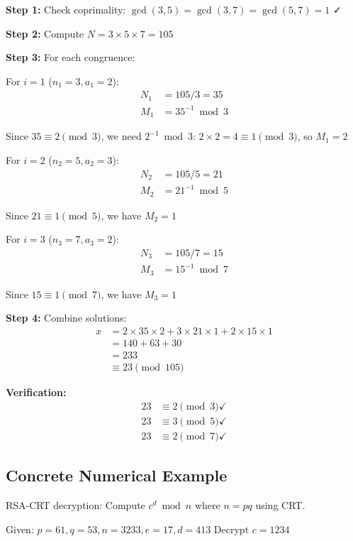 \documentclass[12pt,a4paper]{article}
\theoremstyle{definition}
\begin{document}
\textbf{Step 1:} Check coprimality: $\gcd(3,5) = \gcd(3,7) = \gcd(5,7) = 1$ ✓

\textbf{Step 2:} Compute $N = 3 \times 5 \times 7 = 105$

\textbf{Step 3:} For each congruence:

For $i = 1$ ($n_1 = 3, a_1 = 2$):
\begin{align}
N_1 &= 105/3 = 35\\
M_1 &= 35^{-1} \bmod 3
\end{align}

Since $35 \equiv 2 \pmod{3}$, we need $2^{-1} \bmod 3$:
$2 \times 2 = 4 \equiv 1 \pmod{3}$, so $M_1 = 2$

For $i = 2$ ($n_2 = 5, a_2 = 3$):
\begin{align}
N_2 &= 105/5 = 21\\
M_2 &= 21^{-1} \bmod 5
\end{align}

Since $21 \equiv 1 \pmod{5}$, we have $M_2 = 1$

For $i = 3$ ($n_3 = 7, a_3 = 2$):
\begin{align}
N_3 &= 105/7 = 15\\
M_3 &= 15^{-1} \bmod 7
\end{align}

Since $15 \equiv 1 \pmod{7}$, we have $M_3 = 1$

\textbf{Step 4:} Combine solutions:
\begin{align}
x &= 2 \times 35 \times 2 + 3 \times 21 \times 1 + 2 \times 15 \times 1\\
  &= 140 + 63 + 30\\
  &= 233\\
  &\equiv 23 \pmod{105}
\end{align}

\textbf{Verification:}
\begin{align}
23 &\equiv 2 \pmod{3} \checkmark\\
23 &\equiv 3 \pmod{5} \checkmark\\
23 &\equiv 2 \pmod{7} \checkmark
\end{align}

\subsection{Concrete Numerical Example}

RSA-CRT decryption: Compute $c^d \bmod n$ where $n = pq$ using CRT.

Given: $p = 61, q = 53, n = 3233, e = 17, d = 413$
Decrypt $c = 1234$
\end{document}
